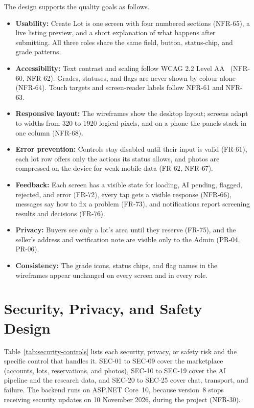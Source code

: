 The design supports the quality goals as follows.
\begin{itemize}
\item \textbf{Usability:} Create Lot is one screen with four numbered sections (NFR-65), a live listing preview, and a short explanation of what happens after submitting. All three roles share the same field, button, status-chip, and grade patterns.
\item \textbf{Accessibility:} Text contrast and scaling follow WCAG 2.2 Level AA~\citep{wcag22} (NFR-60, NFR-62). Grades, statuses, and flags are never shown by colour alone (NFR-64). Touch targets and screen-reader labels follow NFR-61 and NFR-63.
\item \textbf{Responsive layout:} The wireframes show the desktop layout; screens adapt to widths from 320 to 1920 logical pixels, and on a phone the panels stack in one column (NFR-68).
\item \textbf{Error prevention:} Controls stay disabled until their input is valid (FR-61), each lot row offers only the actions its status allows, and photos are compressed on the device for weak mobile data (FR-62, NFR-67).
\item \textbf{Feedback:} Each screen has a visible state for loading, AI pending, flagged, rejected, and error (FR-72), every tap gets a visible response (NFR-66), messages say how to fix a problem (FR-73), and notifications report screening results and decisions (FR-76).
\item \textbf{Privacy:} Buyers see only a lot's area until they reserve (FR-75), and the seller's address and verification note are visible only to the Admin (PR-04, PR-06).
\item \textbf{Consistency:} The grade icons, status chips, and flag names in the wireframes appear unchanged on every screen and in every role.
\end{itemize}

\section{Security, Privacy, and Safety Design }
Table~\ref{tab:security-controls} lists each security, privacy, or safety risk
and the specific control that handles it. SEC-01 to SEC-09 cover the marketplace
(accounts, lots, reservations, and photos), SEC-10 to SEC-19 cover the AI
pipeline and the research data, and SEC-20 to SEC-25 cover chat, transport, and
failure. The backend runs on ASP.NET Core~10, because version~8 stops receiving
security updates on 10 November 2026, during the project (NFR-30).

